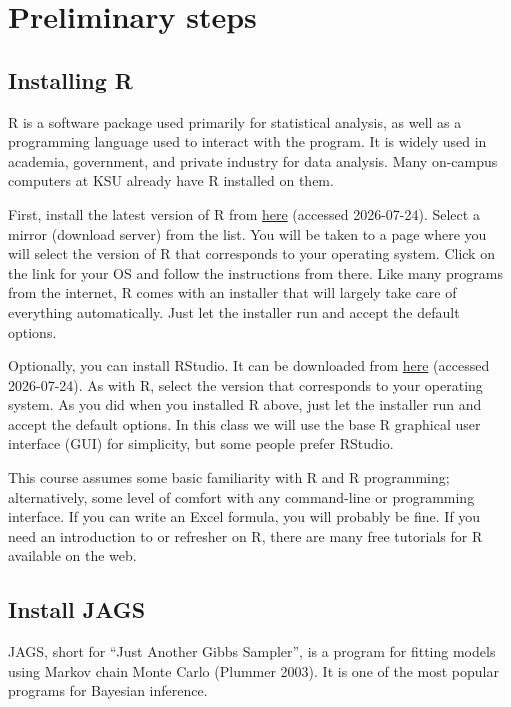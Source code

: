 \documentclass[
  13,
  letterpaper,
]{report}
\begin{document}
\section{Preliminary steps}\label{preliminary-steps}

\subsection{Installing R}\label{installing-r}

R is a software package used primarily for statistical analysis, as well
as a programming language used to interact with the program. It is
widely used in academia, government, and private industry for data
analysis. Many on-campus computers at KSU already have R installed on
them.

First, install the latest version of R from
\href{https://cran.r-project.org/mirrors.html}{here} (accessed
2026-07-24). Select a mirror (download server) from the list. You will
be taken to a page where you will select the version of R that
corresponds to your operating system. Click on the link for your OS and
follow the instructions from there. Like many programs from the
internet, R comes with an installer that will largely take care of
everything automatically. Just let the installer run and accept the
default options.

Optionally, you can install RStudio. It can be downloaded from
\href{https://docs.posit.co/ide/user/\#rstudio-ide-oss-downloads}{here}
(accessed 2026-07-24). As with R, select the version that corresponds to
your operating system. As you did when you installed R above, just let
the installer run and accept the default options. In this class we will
use the base R graphical user interface (GUI) for simplicity, but some
people prefer RStudio.

This course assumes some basic familiarity with R and R programming;
alternatively, some level of comfort with any command-line or
programming interface. If you can write an Excel formula, you will
probably be fine. If you need an introduction to or refresher on R,
there are many free tutorials for R available on the web.

\subsection{Install JAGS}\label{install-jags}

JAGS, short for ``Just Another Gibbs Sampler'', is a program for fitting
models using Markov chain Monte Carlo (Plummer 2003). It is one of the
most popular programs for Bayesian inference.
\end{document}
